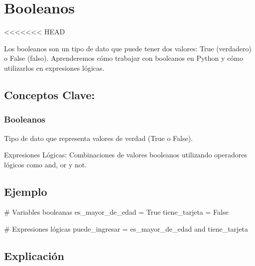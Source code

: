 \documentclass[
  a4paper,
  DIV=11,
  numbers=noendperiod,
  onepage,
  openany]{scrreprt}
\newenvironment{Shaded}{\begin{snugshade}}{\end{snugshade}}
\newcommand{\CommentTok}[1]{\textcolor[rgb]{0.37,0.37,0.37}{#1}}
\newcommand{\KeywordTok}[1]{\textcolor[rgb]{0.00,0.23,0.31}{#1}}
\newcommand{\NormalTok}[1]{\textcolor[rgb]{0.00,0.23,0.31}{#1}}
\newcommand{\OperatorTok}[1]{\textcolor[rgb]{0.37,0.37,0.37}{#1}}
\newcommand{\VariableTok}[1]{\textcolor[rgb]{0.07,0.07,0.07}{#1}}
\begin{document}
\hypertarget{booleanos}{%
\chapter{Booleanos}\label{booleanos}}

\textless\textless\textless\textless\textless\textless\textless{} HEAD

Los booleanos son un tipo de dato que puede tener dos valores: True
(verdadero) o False (falso). Aprenderemos cómo trabajar con booleanos en
Python y cómo utilizarlos en expresiones lógicas.

\hypertarget{conceptos-clave-26}{%
\section{Conceptos Clave:}\label{conceptos-clave-26}}

\hypertarget{booleanos-1}{%
\subsection{Booleanos}\label{booleanos-1}}

Tipo de dato que representa valores de verdad (True o False).

Expresiones Lógicas: Combinaciones de valores booleanos utilizando
operadores lógicos como and, or y not.

\hypertarget{ejemplo-26}{%
\section{Ejemplo}\label{ejemplo-26}}

\begin{Shaded}
\begin{Highlighting}[]
\CommentTok{\# Variables booleanas}
\NormalTok{es\_mayor\_de\_edad }\OperatorTok{=} \VariableTok{True}
\NormalTok{tiene\_tarjeta }\OperatorTok{=} \VariableTok{False}

\CommentTok{\# Expresiones lógicas}
\NormalTok{puede\_ingresar }\OperatorTok{=}\NormalTok{ es\_mayor\_de\_edad }\KeywordTok{and}\NormalTok{ tiene\_tarjeta}
\end{Highlighting}
\end{Shaded}

\hypertarget{explicaciuxf3n-26}{%
\section{Explicación}\label{explicaciuxf3n-26}}
\end{document}
